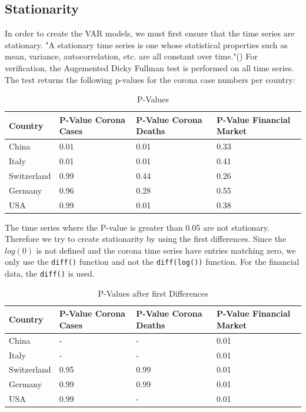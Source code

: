 \documentclass[11pt]{article}
\begin{document}
\subsection{Stationarity}
In order to create the VAR models, we must first ensure that the time series are stationary. "A stationary time series is one whose statistical properties such as mean, variance, autocorrelation, etc. are all constant over time."(\cite{Stationa72:online}) For verification, the Augemented Dicky Fullman test is performed on all time series. The test returns the following p-values for the corona case numbers per country:
\begin{table}[H]
\centering
\caption{P-Values }
\label{tab:p-values-corona}
\begin{tabular}{|l|l|l|l|}
\hline
\textbf{Country} &  \textbf{P-Value Corona Cases} & \textbf{P-Value Corona Deaths} & \textbf{P-Value Financial Market} \\ \hline
China            & 0.01 & 0.01 & 0.33            \\ \hline
Italy            & 0.01 & 0.01 & 0.41           \\ \hline
Switzerland      & 0.99 & 0.44 & 0.26          \\ \hline
Germany          & 0.96 & 0.28  & 0.55          \\ \hline
USA              & 0.99 & 0.01  & 0.38        \\ \hline
\end{tabular}
\end{table}
The time series where the P-value is greater than 0.05 are not stationary. Therefore we try to create stationarity by using the first differences. Since the $log(0)$ is not defined and the corona time series have entries matching zero, we only use the \lstinline{diff()} function and  not the \lstinline{diff(log())} function. For the financial data, the \lstinline{diff()} is used.
\begin{table}[h!]
\centering
\caption{P-Values after first Differences}
\label{tab:p-values-first-diff}
\begin{tabular}{|l|l|l|l|}
\hline
\textbf{Country} &\textbf{P-Value Corona Cases} & \textbf{P-Value Corona Deaths} & \textbf{P-Value Financial Market}  \\ \hline
China            & - & - & 0.01            \\ \hline
Italy            & - & - & 0.01          \\ \hline
Switzerland      & 0.95 & 0.99 & 0.01           \\ \hline
Germany          & 0.99 & 0.99 & 0.01           \\ \hline
USA              & 0.99 & -  & 0.01         \\ \hline
\end{tabular}
\end{table}
\end{document}
